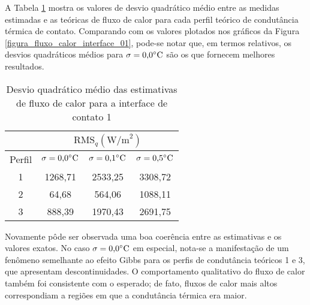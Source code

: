 A Tabela \ref{tabela_rms_fluxo_calor_interface_1} mostra os valores de desvio quadrático médio entre as medidas estimadas e as teóricas de fluxo de calor para cada perfil teórico de condutância térmica de contato. Comparando com os valores plotados nos gráficos da Figura \ref{figura_fluxo_calor_interface_01}, pode-se notar que, em termos relativos, os desvios quadráticos médios para $\sigma = \text{0,0}\celsius$ são os que fornecem melhores resultados.
\begin{table}[H]
	\centering
	\caption{Desvio quadrático médio das estimativas de fluxo de calor para a interface de contato 1}
	\begin{tabular}{c|c|c|c|}
		\cline{2-4}
		& \multicolumn{3}{c|}{$\text{RMS}_{q}(\text{W/m}^2)$} \\ \hline
		\multicolumn{1}{|c|}{Perfil} & $\sigma = \text{0,0}\celsius$   & $\sigma = \text{0,1}\celsius$    & $\sigma = \text{0,5}\celsius$  \\ \hline
		\multicolumn{1}{|c|}{1}      & 1268,71        &  2533,25      & 3308,72          \\ \hline
		\multicolumn{1}{|c|}{2}      & 64,68       &  564,06      &  1088,11     \\ \hline
		\multicolumn{1}{|c|}{3}      & 888,39        & 1970,43       & 2691,75        \\ \hline
	\end{tabular}
	\label{tabela_rms_fluxo_calor_interface_1}
\end{table}

Novamente pôde ser observada uma boa coerência entre as estimativas e os valores exatos. No caso $\sigma = \text{0,0}\celsius$ em especial, nota-se a manifestação de um fenômeno semelhante ao efeito Gibbs\citep{livro_boyce} para os perfis de condutância teóricos 1 e 3, que apresentam descontinuidades. O comportamento qualitativo do fluxo de calor também foi consistente com o esperado; de fato, fluxos de calor mais altos correspondiam a regiões em que a condutância térmica era maior.

